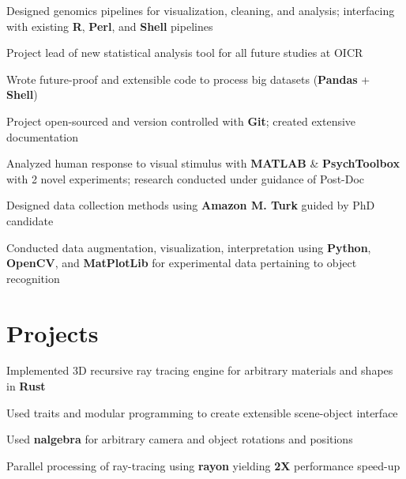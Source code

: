\documentclass[]{chandan-cv}
\begin{document}
\begin{minipage}[t]{0.75\textwidth}
\begin{tightemize}
	\item Designed genomics pipelines for visualization, cleaning, and analysis; 
	interfacing with existing \textbf{R}, \textbf{Perl}, and \textbf{Shell} pipelines
	\item Project lead of new statistical analysis tool for all future studies at OICR
	\item Wrote future-proof and extensible code to process big datasets (\textbf{Pandas} + \textbf{Shell})
	\item Project open-sourced and version controlled with \textbf{Git}; created extensive documentation
\end{tightemize}
\sectionsep

\begin{tightemize}
	\item Analyzed human response to visual stimulus with \textbf{MATLAB} \& \textbf{PsychToolbox} with 2 novel experiments; 
	research conducted under guidance of Post-Doc
	\item Designed data collection methods using \textbf{Amazon M. Turk} guided by PhD candidate
	\item Conducted data augmentation, visualization, interpretation using \textbf{Python}, 
	\textbf{OpenCV}, and \textbf{MatPlotLib} for experimental data pertaining to object recognition
\end{tightemize}
\sectionsep


\section{Projects}

\descript{ }
\location{ }
\begin{tightemize}
	\item Implemented 3D recursive ray tracing engine for arbitrary materials and shapes in \textbf{Rust}
	\item Used traits and modular programming to create extensible scene-object interface
	\item Used \textbf{nalgebra} for arbitrary camera and object rotations and positions
	\item Parallel processing of ray-tracing using \textbf{rayon} yielding \textbf{2X} performance speed-up
\end{tightemize}
\sectionsep


\end{minipage}
\end{document}
